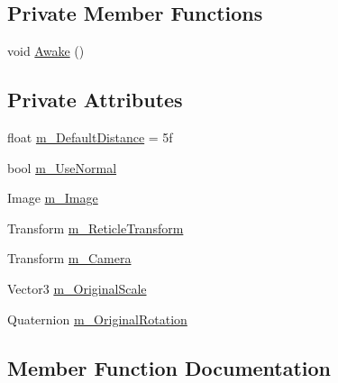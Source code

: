 \subsection*{Private Member Functions}
\begin{DoxyCompactItemize}
\item 
void \mbox{\hyperlink{class_v_r_standard_assets_1_1_utils_1_1_reticle_ac8625110c11352313c81fb865a381c6b}{Awake}} ()
\end{DoxyCompactItemize}
\subsection*{Private Attributes}
\begin{DoxyCompactItemize}
\item 
float \mbox{\hyperlink{class_v_r_standard_assets_1_1_utils_1_1_reticle_ac77dc69ef46137708384c0cf3c0b3e28}{m\+\_\+\+Default\+Distance}} = 5f
\item 
bool \mbox{\hyperlink{class_v_r_standard_assets_1_1_utils_1_1_reticle_a8b0bdbc4b1b890400f1f6a36159eb05f}{m\+\_\+\+Use\+Normal}}
\item 
Image \mbox{\hyperlink{class_v_r_standard_assets_1_1_utils_1_1_reticle_a4153bcdb74fe1d18159d7c4608aa7bcf}{m\+\_\+\+Image}}
\item 
Transform \mbox{\hyperlink{class_v_r_standard_assets_1_1_utils_1_1_reticle_a16294edfd06ba0ec0d5d9d08caddf836}{m\+\_\+\+Reticle\+Transform}}
\item 
Transform \mbox{\hyperlink{class_v_r_standard_assets_1_1_utils_1_1_reticle_a741381fcd055dcd8be14a69f885e9a51}{m\+\_\+\+Camera}}
\item 
Vector3 \mbox{\hyperlink{class_v_r_standard_assets_1_1_utils_1_1_reticle_a58ca79ce295ea776a373e037dc8564cb}{m\+\_\+\+Original\+Scale}}
\item 
Quaternion \mbox{\hyperlink{class_v_r_standard_assets_1_1_utils_1_1_reticle_a79d3e7b210157509e2885c4152a8c717}{m\+\_\+\+Original\+Rotation}}
\end{DoxyCompactItemize}


\subsection{Member Function Documentation}
\mbox{\label{class_v_r_standard_assets_1_1_utils_1_1_reticle_ac8625110c11352313c81fb865a381c6b}} 
